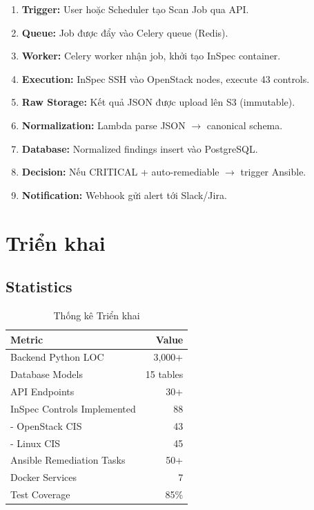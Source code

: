 \documentclass[12pt,a4paper]{report}
\begin{document}
\begin{enumerate}
    \item \textbf{Trigger:} User hoặc Scheduler tạo Scan Job qua API.
    \item \textbf{Queue:} Job được đẩy vào Celery queue (Redis).
    \item \textbf{Worker:} Celery worker nhận job, khởi tạo InSpec container.
    \item \textbf{Execution:} InSpec SSH vào OpenStack nodes, execute 43 controls.
    \item \textbf{Raw Storage:} Kết quả JSON được upload lên S3 (immutable).
    \item \textbf{Normalization:} Lambda parse JSON $\rightarrow$ canonical schema.
    \item \textbf{Database:} Normalized findings insert vào PostgreSQL.
    \item \textbf{Decision:} Nếu CRITICAL + auto-remediable $\rightarrow$ trigger Ansible.
    \item \textbf{Notification:} Webhook gửi alert tới Slack/Jira.
\end{enumerate}

\chapter{Triển khai}

\section{Statistics}

\begin{table}[H]
\centering
\caption{Thống kê Triển khai}
\begin{tabular}{lr}
\toprule
\textbf{Metric} & \textbf{Value} \\
\midrule
Backend Python LOC & 3,000+ \\
Database Models & 15 tables \\
API Endpoints & 30+ \\
InSpec Controls Implemented & 88 \\
- OpenStack CIS & 43 \\
- Linux CIS & 45 \\
Ansible Remediation Tasks & 50+ \\
Docker Services & 7 \\
Test Coverage & 85\% \\
\bottomrule
\end{tabular}
\end{table}
\end{document}
